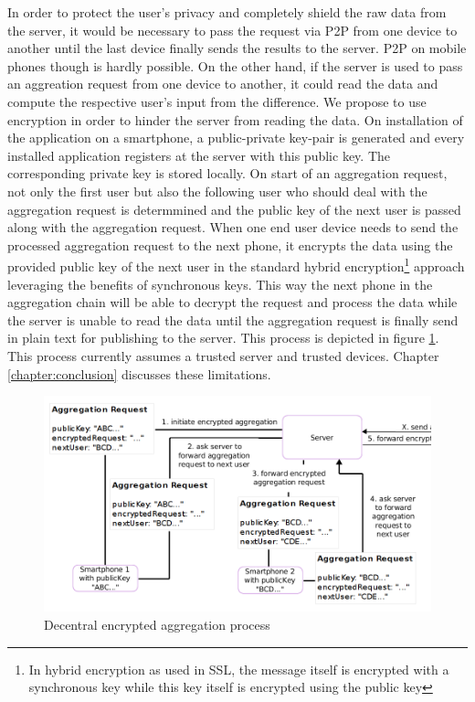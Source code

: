  In order to protect the user's privacy and completely shield the raw data from the server, it would be necessary to pass the request via P2P from one device to another until the last device finally sends the results to the server. P2P on mobile phones though is hardly possible. On the other hand, if the server is used to pass an aggreation request from one device to another, it could read the data and compute the respective user's input from the difference. We propose to use encryption in order to hinder the server from reading the data. On installation of the application on a smartphone, a public-private key-pair is generated and every installed application registers at the server with this public key. The corresponding private key is stored locally. On start of an aggregation request, not only the first user but also the following user who should deal with the aggregation request is determmined and the public key of the next user is passed along with the aggregation request. When one end user device needs to send the processed aggregation request to the next phone, it encrypts the data using the provided public key of the next user in the standard hybrid encryption\footnote{In hybrid encryption as used in SSL, the message itself is encrypted with a synchronous key while this key itself is encrypted using the public key} approach leveraging the benefits of synchronous keys. This way the next phone in the aggregation chain will be able to decrypt the request and process the data while the server is unable to read the data until the aggregation request is finally send in plain text for publishing to the server. This process is depicted in figure \ref{decentral-aggregation-encrypted}. This process currently assumes a trusted server and trusted devices. Chapter \ref{chapter:conclusion} discusses these limitations.

 \begin{figure}[h!]
	\caption{Decentral encrypted aggregation process}
	\label{decentral-aggregation-encrypted}
	\includegraphics[width=\textwidth]{data/diagrams/decentral-encrypted-aggregation-4.png}
\end{figure}

